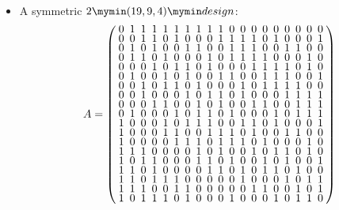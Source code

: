 \documentclass{beamer}
\newcommand{\bibd}[1]{2 \mymin #1 \mymin design}
\begin{document}
\begin{frame}

  \begin{itemize}
  \item A symmetric $\bibd{(19,9,4)}$:
    \[
      A=
      \arraycolsep=2.5pt\def\arraystretch{0.625}
      \left(
        \begin{array}{ccccccccccccccccccc}
          0&1&1&1&1&1&1&1&1&1&0&0&0&0&0&0&0&0&0\\
          0&0&1&1&0&1&0&0&0&1&1&1&1&0&1&0&0&0&1\\
          0&1&0&1&0&0&1&1&0&0&1&1&1&0&0&1&1&0&0\\
          0&1&1&0&1&0&0&0&1&0&1&1&1&1&0&0&0&1&0\\
          0&0&0&1&0&1&1&0&1&0&0&0&1&1&1&1&0&1&0\\
          0&1&0&0&1&0&1&0&0&1&1&0&0&1&1&1&0&0&1\\
          0&0&1&0&1&1&0&1&0&0&0&1&0&1&1&1&1&0&0\\
          0&0&1&0&0&0&1&0&1&1&0&1&0&0&0&1&1&1&1\\
          0&0&0&1&1&0&0&1&0&1&0&0&1&1&0&0&1&1&1\\
          0&1&0&0&0&1&0&1&1&0&1&0&0&0&1&0&1&1&1\\
          1&0&0&0&1&0&1&1&1&0&0&1&1&0&1&0&0&0&1\\
          1&0&0&0&1&1&0&0&1&1&1&0&1&0&0&1&1&0&0\\
          1&0&0&0&0&1&1&1&0&1&1&1&0&1&0&0&0&1&0\\
          1&1&1&0&0&0&0&1&0&1&0&0&1&0&1&1&0&1&0\\
          1&0&1&1&0&0&0&1&1&0&1&0&0&1&0&1&0&0&1\\
          1&1&0&1&0&0&0&0&1&1&0&1&0&1&1&0&1&0&0\\
          1&1&0&1&1&1&0&0&0&0&0&1&0&0&0&1&0&1&1\\
          1&1&1&0&0&1&1&0&0&0&0&0&1&1&0&0&1&0&1\\
          1&0&1&1&1&0&1&0&0&0&1&0&0&0&1&0&1&1&0\\
        \end{array}
      \right)
    \]
  \end{itemize}
  
\end{frame}
\end{document}
